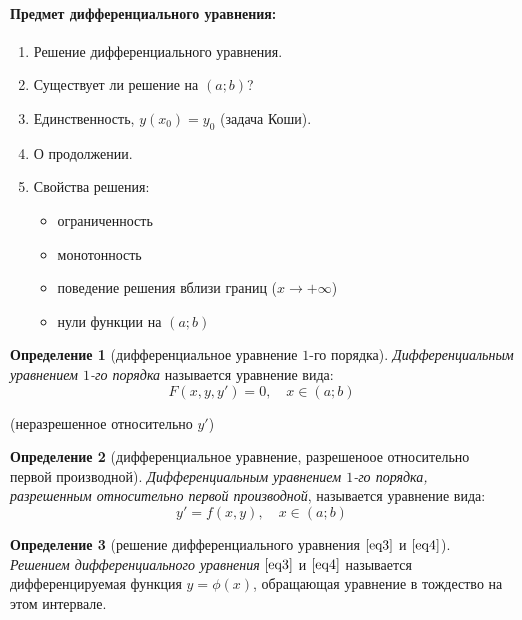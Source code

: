 \documentclass[11pt,a4paper,oneside]{report}
\theoremstyle{definition}
\newtheorem{definition}{Определение}[section]
\theoremstyle{plain}
\theoremstyle{remark}
\begin{document}
\paragraph*{Предмет дифференциального уравнения:}
\begin{enumerate}
    \item Решение дифференциального уравнения.
    \item Существует ли решение на $(a;b)$?
    \item Единственность, $y(x_0)=y_0$ (задача Коши).
    \item О продолжении.
    \item Свойства решения: \begin{itemize}
              \item ограниченность
              \item монотонность
              \item поведение решения вблизи границ ($x \rightarrow +\infty$)
              \item нули функции на $(a;b)$
          \end{itemize}
\end{enumerate}

\begin{definition}[дифференциальное уравнение $1$-го порядка]
    \emph{Дифференциальным уравнением $1$-го порядка} называется уравнение вида:
    \begin{equation}\label{eq3}
        F(x,y,y')=0, \quad x \in (a;b)
    \end{equation}
    \begin{center}
        (неразрешенное относительно $y'$)
    \end{center}
\end{definition}

\begin{definition}[дифференциальное уравнение, разрешеноое относительно первой производной]
    \emph{Дифференциальным уравнением $1$-го порядка, разрешенным относительно первой производной}, называется уравнение вида:
    \begin{equation}\label{eq4}
        y'=f(x,y), \quad x \in (a;b)
    \end{equation}
\end{definition}

\begin{definition}[решение дифференциального уравнения $\ref{eq3}$ и $\ref{eq4}$]
    \emph{Решением дифференциального уравнения} $\ref{eq3}$ и $\ref{eq4}$ называется дифференцируемая функция $y = \phi(x)$, обращающая уравнение в тождество на этом интервале.
\end{definition}
\end{document}
